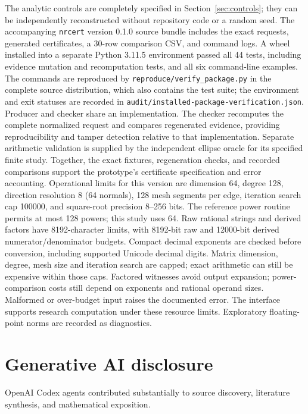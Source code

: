 \documentclass[11pt]{article}
\theoremstyle{definition}
\theoremstyle{remark}
\numberwithin{equation}{section}
\begin{document}
The analytic controls are completely specified in
Section~\ref{sec:controls}; they can be independently reconstructed without
repository code or a random seed.
The accompanying \texttt{nrcert} version 0.1.0 source bundle includes the
exact requests, generated certificates, a 30-row comparison CSV, and
command logs. A wheel installed into a separate Python 3.11.5 environment
passed all 44 tests, including evidence mutation and recomputation tests,
and all six command-line examples. The commands are reproduced by
\nolinkurl{reproduce/verify_package.py} in the complete source distribution,
which also contains the test suite; the environment and exit statuses
are recorded in \nolinkurl{audit/installed-package-verification.json}.
Producer and checker share an implementation. The checker recomputes the
complete normalized request and compares regenerated evidence, providing
reproducibility and tamper detection relative to that implementation.
Separate arithmetic validation is supplied by the independent ellipse
oracle for its specified finite study. Together, the exact fixtures,
regeneration checks, and recorded comparisons support the prototype's
certificate specification and error accounting.
Operational limits for this version are dimension 64, degree 128,
direction resolution 8 (64 normals), 128 mesh segments per edge,
iteration search cap 100000, and square-root precision 8--256 bits.
The reference power routine permits at most 128 powers; this study uses 64.
Raw rational strings and derived factors have 8192-character limits, with
8192-bit raw and 12000-bit derived numerator/denominator budgets.
Compact decimal exponents are checked before conversion, including
supported Unicode decimal digits. Matrix dimension, degree, mesh size and
iteration search are capped; exact arithmetic can still be expensive
within those caps. Factored witnesses avoid output expansion; power-comparison
costs still depend on exponents and rational operand sizes. Malformed or
over-budget input raises the documented error. The interface supports
research computation under these resource limits.
Exploratory floating-point norms are recorded as diagnostics.

\section*{Generative AI disclosure}
OpenAI Codex agents contributed substantially to source discovery, literature synthesis, and mathematical exposition.

\begingroup\small


\endgroup
\end{document}

